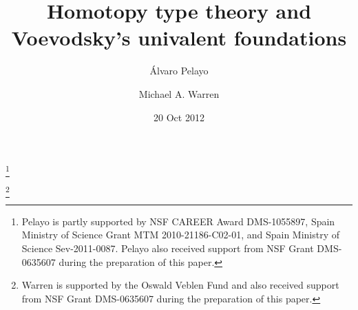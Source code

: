 \documentclass{amsart}
\theoremstyle{definition}
\theoremstyle{remark}
\numberwithin{equation}{section}
\begin{document}
\setcounter{myi}{0}

\title[Homotopy type theory]{Homotopy type theory and
  Voevodsky's univalent foundations}


\author[\'{A}. Pelayo]{\'{A}lvaro Pelayo}
\address{Washington University\\  
  Mathematics Department \\
  One Brookings Drive, Campus Box 1146\\
  St Louis, MO 63130, USA, AND School of Mathematics,
  Institute for Advanced Study\\
  Einstein Drive, Princeton\\
  NJ 08540 USA}
\thanks{Pelayo is partly supported by NSF CAREER Award DMS-1055897, Spain 
Ministry of Science Grant MTM 2010-21186-C02-01, and 
Spain Ministry of Science Sev-2011-0087.  Pelayo also received support
from NSF Grant DMS-0635607 during the preparation of this paper.}
\author[M. A. Warren]{Michael A. Warren}
\address{School of Mathematics,
  Institute for Advanced Study\\
  Einstein Drive, Princeton\\
  NJ 08540 USA.}
\curraddr{}
\thanks{Warren is supported by the Oswald Veblen Fund and also
  received support from NSF Grant DMS-0635607 during the preparation
  of this paper.}


\date{20 Oct 2012}

\dedicatory{}
\end{document}

